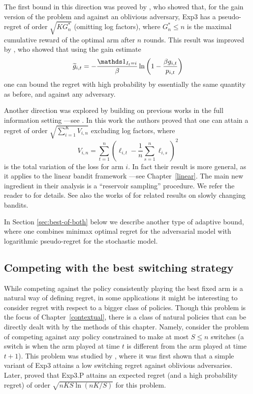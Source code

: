 The first bound in this direction was proved by \cite{ACFS03}, who showed that, for the gain version of the problem and against an oblivious adversary, Exp3 has a pseudo-regret of order $\sqrt{K G_n^*}$ (omitting log factors), where $G_n^* \leq n$ is the maximal cumulative reward of the optimal arm after $n$ rounds. This result was improved by \cite{AB10}, who showed that using the gain estimate
\[
    \tilde{g}_{i,t} = - \frac{\ds1_{I_t = i}}{\beta} \ln \left(1 - \frac{\beta g_{i,t}}{p_{i,t}} \right)
\]
one can bound the regret with high probability by essentially the same quantity as before, and against any adversary.

Another direction was explored by \cite{HK09} building on previous works in the full information setting ---see \cite{CMS07}. In this work the authors proved that one can attain a regret of order $\sqrt{\sum_{i=1}^K V_{i,n}}$ excluding log factors, where
\[
    V_{i,n} = \sum_{t=1}^n \left(\ell_{i,t} - \frac{1}{n} \sum_{s=1}^n \ell_{i,s} \right)^2
\]
is the total variation of the loss for arm $i$. In fact their result is more general, as it applies to the linear bandit framework ---see Chapter~\ref{linear}. The main new ingredient in their analysis is a ``reservoir sampling'' procedure. We refer the reader to \cite{HK09} for details. See also the works of \cite{slivkins2008adapting,slivkins2009contextual} for related results on slowly changing bandits.

In Section \ref{sec:best-of-both} below we describe another type of adaptive bound, where one combines minimax optimal regret for the adversarial model with logarithmic pseudo-regret for the stochastic model.


\subsection{Competing with the best switching strategy} \label{sec:exp3S}
While competing against the policy consistently playing the best fixed arm is a natural way of defining regret, in some applications it might be interesting to consider regret with respect to a bigger class of policies. Though this problem is the focus of Chapter~\ref{contextual}, there is a class of natural policies that can be directly dealt with by the methods of this chapter. Namely, consider the problem of competing against any policy constrained to make at most $S \leq n$ switches (a switch is when the arm played at time $t$ is different from the arm played at time $t+1$). This problem was studied by \cite{Aue02}, where it was first shown that a simple variant of Exp3 attains a low switching regret against oblivious adversaries. Later, \cite{AB10} proved that Exp3.P attains an expected regret (and a high probability regret) of order $\sqrt{n K S \ln (n K /S)}$ for this problem.


